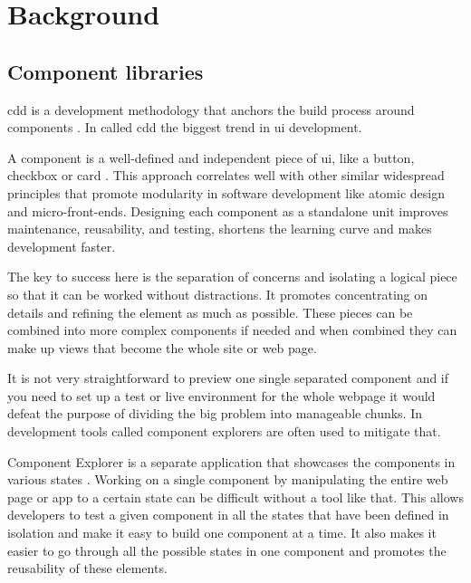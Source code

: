 \documentclass{master_thesis}
\begin{document}
\section{Background}



\subsection{Component libraries}


\ac{cdd} is a development methodology that anchors the build process around components \citep{Coleman2017}. In \citeyear{Coleman2017} \citeauthor{Coleman2017} called \ac{cdd} the biggest trend in \ac{ui} development.

A component is a well-defined and independent piece of \ac{ui}, like a button, checkbox or card \citep{Ella2019}. This approach correlates well with other similar widespread principles that promote modularity in software development like atomic design and micro-front-ends. Designing each component as a standalone unit improves maintenance, reusability, and testing, shortens the learning curve and makes development faster.

The key to success here is the separation of concerns and isolating a logical piece so that it can be worked without distractions. It promotes concentrating on details and refining the element as much as possible. These pieces can be combined into more complex components if needed and when combined they can make up views that become the whole site or web page.

It is not very straightforward to preview one single separated component and if you need to set up a test or live environment for the whole webpage it would defeat the purpose of dividing the big problem into manageable chunks. In development tools called component explorers are often used to mitigate that.

Component Explorer is a separate application that showcases the components in various states \citep{Coleman2017}. Working on a single component by manipulating the entire web page or app to a certain state can be difficult without a tool like that. This allows developers to test a given component in all the states that have been defined in isolation and make it easy to build one component at a time. It also makes it easier to go through all the possible states in one component and promotes the reusability of these elements.
\end{document}
